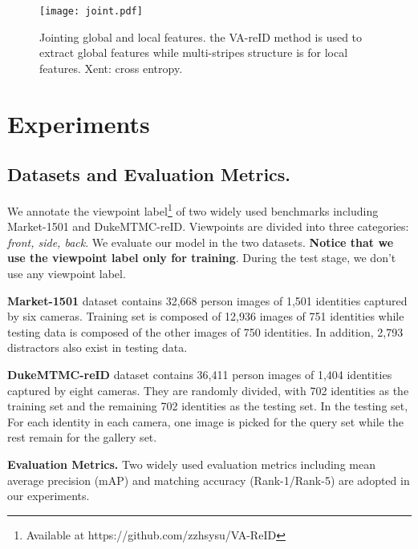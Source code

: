 \documentclass[letterpaper]{article} \usepackage{aaai20}  \usepackage{times}  \usepackage{helvet} \usepackage{courier}  \usepackage[hyphens]{url}  \usepackage{graphicx} \usepackage{array}
\begin{document}
\begin{figure}[!t]
\centering
\texttt{[image: joint.pdf]}  
\caption{Jointing global and local features. the VA-reID method is used to extract global features while multi-stripes structure is for local features. Xent: cross entropy.}
\label{fig:joint}
\end{figure}


\section{Experiments}
\subsection{Datasets and Evaluation Metrics.}
We annotate the viewpoint label\footnote{Available at https://github.com/zzhsysu/VA-ReID} of two widely used benchmarks including Market-1501 and DukeMTMC-reID. Viewpoints are divided into three categories: \textit{front, side, back}. We evaluate our model in the two datasets. \textbf{Notice that we use the viewpoint label only for training}. During the test stage, we don't use any viewpoint label.


\noindent \textbf{Market-1501} 
dataset contains 32,668 person images of 1,501 identities captured by six cameras. Training set is composed of 12,936 images of 751 identities while testing data is composed of the other images of 750 identities. In addition, 2,793 distractors also exist in testing data. 


\noindent \textbf{DukeMTMC-reID} 
dataset contains 36,411 person images of 1,404 identities captured by eight cameras. They are randomly divided, with 702 identities as the training set and the remaining 702 identities as the testing set. In the testing set, For each identity in each camera, one image is picked for the query set while the rest remain for the gallery set. 


\noindent \textbf{Evaluation Metrics.}
Two widely used evaluation metrics including mean average precision (mAP) and matching accuracy (Rank-1/Rank-5) are adopted in our experiments.
\end{document}
